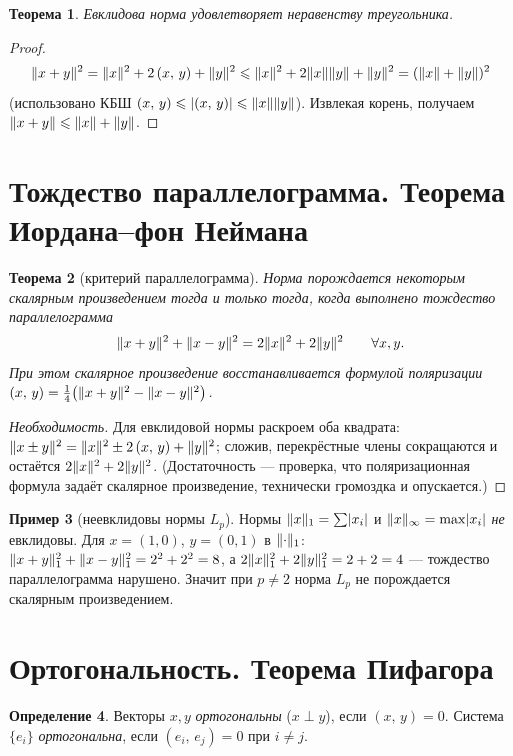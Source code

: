 \documentclass[11pt,a4paper]{article}
\theoremstyle{definition}
\newtheorem{definition}{Определение}[section]
\newtheorem{example}[definition]{Пример}
\theoremstyle{plain}
\newtheorem{theorem}[definition]{Теорема}
\renewcommand{\le}{\leqslant}
\newcommand{\scal}[2]{\left( #1,\,#2\right)}
\DeclarePairedDelimiter{\abs}{\lvert}{\rvert}
\DeclarePairedDelimiter{\norm}{\lVert}{\rVert}
\begin{document}
\begin{theorem}
Евклидова норма удовлетворяет неравенству треугольника.
\end{theorem}

\begin{proof}
\[
  \norm{x+y}^2=\norm x^2+2\scal xy+\norm y^2\le\norm x^2+2\norm x\norm y+\norm y^2=(\norm x+\norm y)^2
\]
(использовано КБШ $\scal xy\le\abs{\scal xy}\le\norm x\norm y$). Извлекая корень, получаем
$\norm{x+y}\le\norm x+\norm y$.
\end{proof}

\section{Тождество параллелограмма. Теорема Иордана–фон Неймана}

\begin{theorem}[критерий параллелограмма]
Норма порождается некоторым скалярным произведением тогда и только тогда, когда выполнено
\emph{тождество параллелограмма}
\[
  \norm{x+y}^2+\norm{x-y}^2=2\norm x^2+2\norm y^2\qquad\forall x,y .
\]
При этом скалярное произведение восстанавливается формулой поляризации
$\scal xy=\tfrac14\bigl(\norm{x+y}^2-\norm{x-y}^2\bigr)$.
\end{theorem}

\begin{proof}[Необходимость]
Для евклидовой нормы раскроем оба квадрата:
$\norm{x\pm y}^2=\norm x^2\pm2\scal xy+\norm y^2$; сложив, перекрёстные члены сокращаются и остаётся
$2\norm x^2+2\norm y^2$. (Достаточность — проверка, что поляризационная формула задаёт скалярное
произведение, технически громоздка и опускается.)
\end{proof}

\begin{example}[неевклидовы нормы $L_p$]
Нормы $\norm x_1=\sum\abs{x_i}$ и $\norm x_\infty=\max\abs{x_i}$ \emph{не} евклидовы. Для
$x=(1,0)$, $y=(0,1)$ в $\norm\cdot_1$: $\norm{x+y}_1^2+\norm{x-y}_1^2=2^2+2^2=8$, а
$2\norm x_1^2+2\norm y_1^2=2+2=4$ — тождество параллелограмма нарушено. Значит при $p\ne2$ норма
$L_p$ не порождается скалярным произведением.
\end{example}

\section{Ортогональность. Теорема Пифагора}

\begin{definition}
Векторы $x,y$ \emph{ортогональны} ($x\perp y$), если $\scal xy=0$. Система $\{e_i\}$
\emph{ортогональна}, если $\scal{e_i}{e_j}=0$ при $i\ne j$.
\end{definition}
\end{document}
